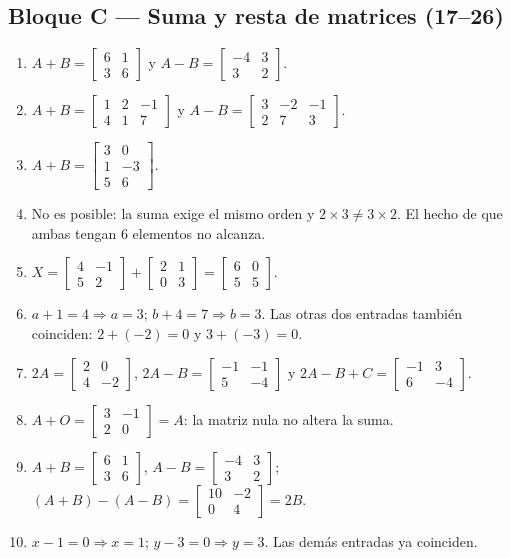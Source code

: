 \documentclass[12pt, letterpaper]{article}
\newcommand{\mwmat}[1]{\ensuremath{\begin{bmatrix}#1\end{bmatrix}}}
\begin{document}
\subsection*{Bloque C — Suma y resta de matrices (17--26)}
\begin{enumerate}[label=\textbf{\arabic*.}, start=17, leftmargin=*]
  \item $A+B=\mwmat{6&1\\3&6}$ y $A-B=\mwmat{-4&3\\3&2}$.
  \item $A+B=\mwmat{1&2&-1\\4&1&7}$ y
        $A-B=\mwmat{3&-2&-1\\2&7&3}$.
  \item $A+B=\mwmat{3&0\\1&-3\\5&6}$.
  \item No es posible: la suma exige el mismo orden y $2\times3\neq3\times2$.
        El hecho de que ambas tengan $6$ elementos no alcanza.
  \item $X=\mwmat{4&-1\\5&2}+\mwmat{2&1\\0&3}
        =\mwmat{6&0\\5&5}$.
  \item $a+1=4\Rightarrow a=3$; $b+4=7\Rightarrow b=3$. Las otras dos
        entradas también coinciden: $2+(-2)=0$ y $3+(-3)=0$.
  \item $2A=\mwmat{2&0\\4&-2}$, $2A-B=\mwmat{-1&-1\\5&-4}$ y
        $2A-B+C=\mwmat{-1&3\\6&-4}$.
  \item $A+O=\mwmat{3&-1\\2&0}=A$: la matriz nula no altera la suma.
  \item $A+B=\mwmat{6&1\\3&6}$, $A-B=\mwmat{-4&3\\3&2}$;
        $(A+B)-(A-B)=\mwmat{10&-2\\0&4}=2B$.
  \item $x-1=0\Rightarrow x=1$; $y-3=0\Rightarrow y=3$. Las demás
        entradas ya coinciden.
\end{enumerate}
\end{document}
